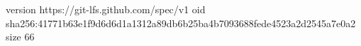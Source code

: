 version https://git-lfs.github.com/spec/v1
oid sha256:41771b63e1f9d6d6d1a1312a89db6b25ba4b7093688fede4523a2d2545a7e0a2
size 66
